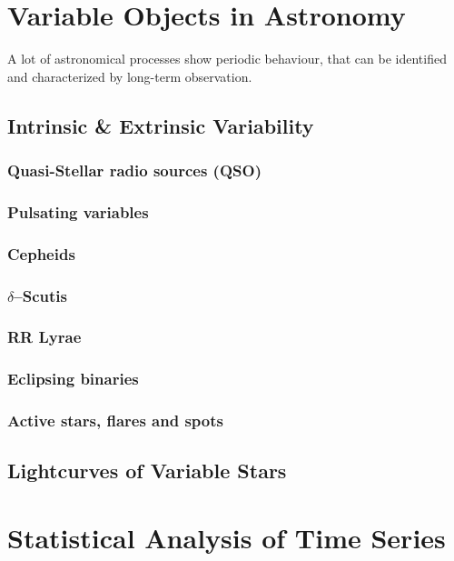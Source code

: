 \section{Variable Objects in Astronomy}
\label{sec:theory-variable-objects}

A lot of astronomical processes show periodic behaviour, that can be identified and characterized by long-term observation.

\subsection{Intrinsic \& Extrinsic Variability}
\subsubsection{Quasi-Stellar radio sources (QSO)}
\subsubsection{Pulsating variables}
\subsubsection{Cepheids}
\subsubsection{$\delta$--Scutis}
\subsubsection{RR Lyrae}
\subsubsection{Eclipsing binaries}
\subsubsection{Active stars, flares and spots}

\subsection{Lightcurves of Variable Stars}

\section{Statistical Analysis of Time Series}

